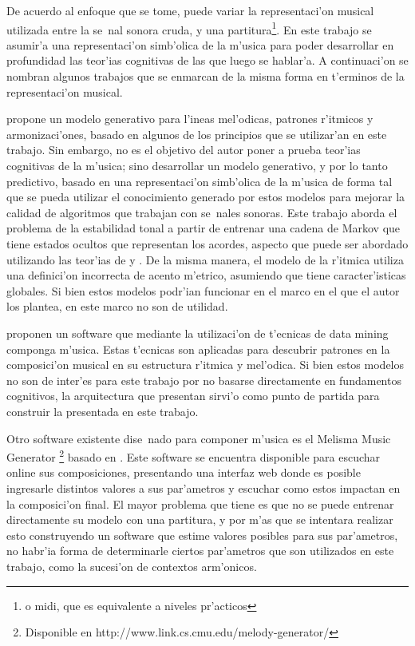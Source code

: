 De acuerdo al enfoque que se tome, puede variar la representaci'on musical utilizada entre la se~nal sonora cruda, 
y una partitura\footnote{o midi, que es equivalente a niveles pr'acticos }.
En este trabajo se asumir'a una representaci'on simb'olica de la m'usica para poder desarrollar en profundidad las teor'ias cognitivas de las 
que luego se hablar'a. A continuaci'on se nombran algunos trabajos que se enmarcan de la misma forma en t'erminos de la representaci'on musical.

\cite{PaieThesis} propone un modelo generativo para l'ineas mel'odicas, 
patrones r'itmicos y armonizaci'ones, basado en algunos de los principios que se utilizar'an en este trabajo. 
Sin embargo, no es el objetivo del autor poner a prueba teor'ias cognitivas de la m'usica; sino desarrollar un modelo generativo,
y por lo tanto predictivo, basado en una representaci'on simb'olica de la m'usica de forma tal que se pueda utilizar el conocimiento generado por estos
modelos para mejorar la calidad de algoritmos que trabajan con se~nales sonoras. Este trabajo aborda el problema de la estabilidad tonal a partir
de entrenar una cadena de Markov que tiene estados ocultos que representan los acordes, aspecto que puede ser abordado utilizando las teor'ias 
de \cite{Krumhansl90} y \cite{Lerdahl2001}. De la misma manera, el modelo de la r'itmica utiliza una definici'on incorrecta de acento m'etrico, asumiendo
que tiene caracter'isticas globales. Si bien estos modelos podr'ian funcionar en el marco en el que el autor los plantea, en este marco no son de utilidad.

\cite{Shih-Chuan} proponen un software que mediante la utilizaci'on de t'ecnicas de data mining componga m'usica. Estas t'ecnicas son aplicadas
para descubrir patrones en la composici'on musical en su estructura r'itmica y mel'odica.
Si bien estos modelos no son de inter'es para este trabajo por no basarse directamente en fundamentos cognitivos, 
la arquitectura que presentan \cite{Shih-Chuan} sirvi'o como punto de partida para construir la presentada en este trabajo. 

Otro software existente dise~nado para componer m'usica es el Melisma Music Generator
\footnote{Disponible en http://www.link.cs.cmu.edu/melody-generator/} basado en \cite{Temperley2004}. 
Este software se encuentra disponible para escuchar online sus composiciones, presentando una interfaz web donde es posible ingresarle distintos
valores a sus par'ametros y escuchar como estos impactan en la composici'on final. 
El mayor problema 
que tiene es que no se puede entrenar directamente su modelo con una partitura, y por m'as que se intentara realizar esto construyendo un software 
que estime valores posibles para sus par'ametros, no habr'ia forma de determinarle ciertos par'ametros que son utilizados en este trabajo, 
como la sucesi'on de contextos arm'onicos.


